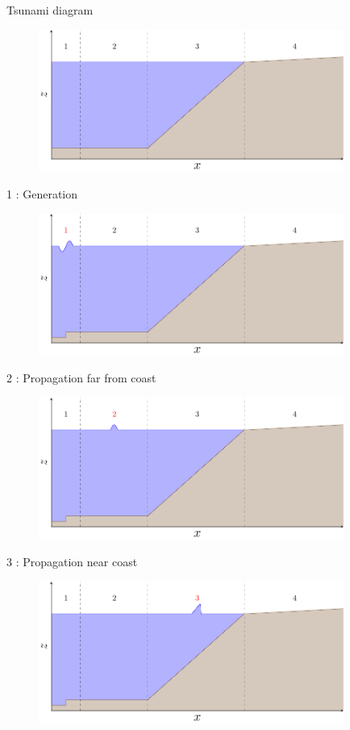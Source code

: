 \documentclass[pdf]{beamer}
\begin{document}
\begin{frame}{Tsunami diagram}
		\begin{figure}
			\includegraphics[width=10cm]{./Pics/TsunamiStages.pdf}
		\end{figure}
\end{frame}

\begin{frame}{{\color{red} 1} : Generation}
	\begin{figure}
		\includegraphics[width=10cm]{./Pics/Tsunami1.pdf}
	\end{figure}
\end{frame}

\begin{frame}{{\color{red} 2} : Propagation far from coast }
	\begin{figure}
		\includegraphics[width=10cm]{./Pics/Tsunami2.pdf}
	\end{figure}
\end{frame}

\begin{frame}{{\color{red} 3} : Propagation near coast }
	\begin{figure}
		\includegraphics[width=10cm]{./Pics/Tsunami3.pdf}
	\end{figure}
\end{frame}
\end{document}
